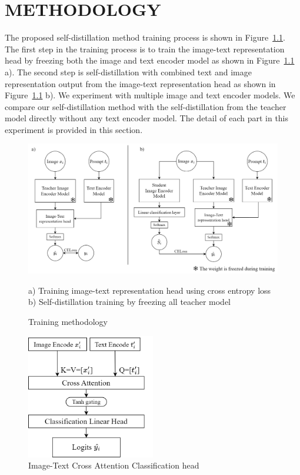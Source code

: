 \chapter{METHODOLOGY}

The proposed self-distillation method training process is shown in Figure~\ref{fig:methodology}.
The first step in the training process is to train the image-text representation head by freezing both the image and text encoder model as shown in Figure~\ref{fig:methodology} a).
The second step is self-distillation with combined text and image representation output from the image-text representation head as shown in Figure~\ref{fig:methodology} b).
We experiment with multiple image and text encoder models.
We compare our self-distillation method with the self-distillation from the teacher model directly without any text encoder model.
The detail of each part in this experiment is provided in this section.

\begin{figure}[h]
    \caption{Training methodology}
    \label{fig:methodology}
    \begin{center}
        \includegraphics[width=1\textwidth]{Images/Methodology.png}
    \end{center}
    \small a) Training image-text representation head using cross entropy loss b) Self-distillation training by freezing all teacher model
\end{figure}

\begin{figure}[h]
    \caption{Image-Text Cross Attention Classification head}
    \label{fig:cross_attention}
    \centering
    \includegraphics[width=0.5\textwidth]{Images/CrossAttention.png}
\end{figure}

